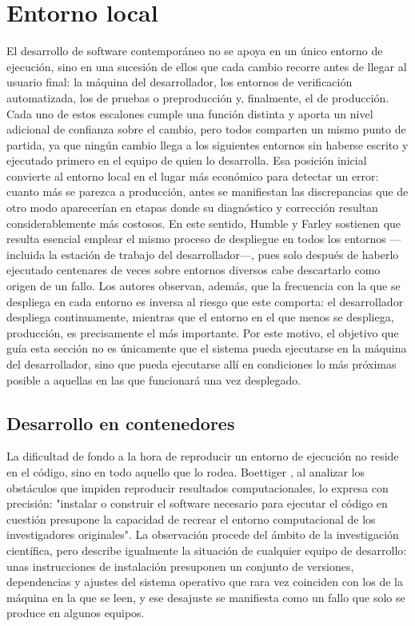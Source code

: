 \section*{Entorno local}
{}
\label{sec:entorno-local}

El desarrollo de software contemporáneo no se apoya en un único entorno de
ejecución, sino en una sucesión de ellos que cada cambio recorre antes de llegar
al usuario final: la máquina del desarrollador, los entornos de verificación
automatizada, los de pruebas o preproducción y, finalmente, el de producción.
Cada uno de estos escalones cumple una función distinta y aporta un nivel
adicional de confianza sobre el cambio, pero todos comparten un mismo punto de
partida, ya que ningún cambio llega a los siguientes entornos sin haberse
escrito y ejecutado primero en el equipo de quien lo desarrolla. Esa posición
inicial convierte al entorno local en el lugar más económico para detectar un
error: cuanto más se parezca a producción, antes se manifiestan las
discrepancias que de otro modo aparecerían en etapas donde su diagnóstico y
corrección resultan considerablemente más costosos. En este sentido, Humble y
Farley \cite{Humble2010} sostienen que resulta esencial emplear el mismo proceso
de despliegue en todos los entornos —incluida la estación de trabajo del
desarrollador—, pues solo después de haberlo ejecutado centenares de veces sobre
entornos diversos cabe descartarlo como origen de un fallo. Los autores observan,
además, que la frecuencia con la que se despliega en cada entorno es inversa al
riesgo que este comporta: el desarrollador despliega continuamente, mientras que
el entorno en el que menos se despliega, producción, es precisamente el más
importante. Por este motivo, el objetivo
que guía esta sección no es únicamente que el sistema pueda ejecutarse en la
máquina del desarrollador, sino que pueda ejecutarse allí en condiciones lo más
próximas posible a aquellas en las que funcionará una vez desplegado.

\subsection*{Desarrollo en contenedores}

La dificultad de fondo a la hora de reproducir un entorno de ejecución no reside
en el código, sino en todo aquello que lo rodea. Boettiger
\cite{Boettiger2015}, al analizar los obstáculos que impiden reproducir
resultados computacionales, lo expresa con precisión: "instalar o construir el
software necesario para ejecutar el código en cuestión presupone la capacidad de
recrear el entorno computacional de los investigadores originales". La
observación procede del ámbito de la investigación científica, pero describe
igualmente la situación de cualquier equipo de desarrollo: unas instrucciones de
instalación presuponen un conjunto de versiones, dependencias y ajustes del
sistema operativo que rara vez coinciden con los de la máquina en la que se
leen, y ese desajuste se manifiesta como un fallo que solo se produce en algunos
equipos.

